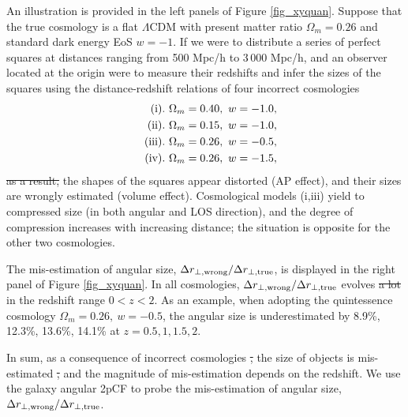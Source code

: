 \documentclass[iop]{emulateapj}
\providecommand{\DIFadd}[1]{{\protect\color{blue}\uwave{#1}}} %
\providecommand{\DIFdel}[1]{{\protect\color{red}\sout{#1}}}                      %
\providecommand{\DIFaddbegin}{} %
\providecommand{\DIFaddend}{} %
\providecommand{\DIFdelbegin}{} %
\providecommand{\DIFdelend}{} %
\begin{document}
An illustration is provided in the left panels of Figure \ref{fig_xyquan}.
Suppose that the true cosmology is a flat $\Lambda$CDM with present matter ratio $\Omega_m=0.26$
and standard dark energy EoS $w=-1$.
If we were to distribute a series of perfect squares at distances ranging from 500 Mpc/h to 3\,000 Mpc/h,
and an observer located at the origin were to measure their redshifts and infer the sizes of the squares
using the distance-redshift relations of four incorrect cosmologies
\begin{eqnarray}
 & &{\rm (i)}.\ \Omega_m=0.40,\ w=-1.0, \nonumber \\ 
 & &{\rm (ii)}.\ \Omega_m=0.15,\ w=-1.0, \nonumber\\ \noindent
 & &{\rm (iii)}.\ \Omega_m=0.26,\ w=-0.5,\nonumber\\ \noindent
 & &{\rm (iv)}.\ \Omega_m=0.26,\ w=-1.5,  \nonumber \noindent 
\end{eqnarray}
\DIFdelbegin \DIFdel{as a result, 
}\DIFdelend \DIFaddbegin \DIFadd{then }\DIFaddend the shapes of the squares appear distorted (AP effect),
and their sizes are wrongly estimated (volume effect).
Cosmological models (i,iii) yield to compressed size (in both angular and LOS direction),
and the degree of compression increases with increasing distance;
the situation is opposite for the other two cosmologies.

The mis-estimation of angular size, ${\Delta r_{\perp, \rm wrong}}/{\Delta r_{\perp, \rm true}}$, 
is displayed in the right panel of Figure \ref{fig_xyquan}.
In all cosmologies, ${\Delta r_{\perp, \rm wrong}}/{\Delta r_{\perp, \rm true}}$ evolves \DIFdelbegin \DIFdel{a lot }\DIFdelend \DIFaddbegin \DIFadd{significantly }\DIFaddend in the redshift range \DIFdelbegin \DIFdel{$0<z<2$}\DIFdelend \DIFaddbegin \DIFadd{$0\leq z\leq 2$}\DIFaddend .
As an example, when adopting the quintessence cosmology $\Omega_m=0.26,\ w=-0.5$,
the angular size is underestimated by 
8.9\%, 12.3\%, 13.6\%, 14.1\% 
at $z=0.5,1,1.5,2$.


In sum, as a consequence of incorrect cosmologies 
\DIFdelbegin \DIFdel{, 
}\DIFdelend the size of objects is mis-estimated \DIFdelbegin \DIFdel{, }\DIFdelend and the magnitude of mis-estimation depends on the redshift.
We use the galaxy angular 2pCF to probe the mis-estimation of angular size, ${\Delta r_{\perp, \rm wrong}}/{\Delta r_{\perp, \rm true}}$.
\end{document}
